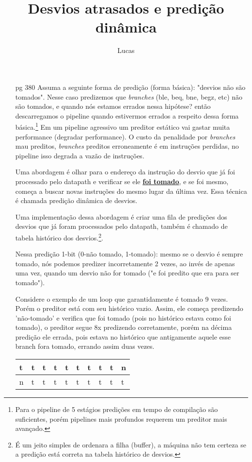 \documentclass{article}
\author{Lucas}
\title{Desvios atrasados e predição dinâmica}
\begin{document}
\maketitle

\begin{enumerate}
\item[pg 380] Assuma a seguinte forma de predição (forma básica): "desvios não
são tomados". Nesse caso predizemos que \textit{branches} (ble, beq, bne, begz,
etc) não são tomados, e quando nós estamos errados nessa hipótese? então
descarregamos o pipeline quando estivermos errados a respeito dessa forma
básica.\footnote{Para o pipeline de 5 estágios predições em tempo de compilação
são suficientes, porém pipelines mais profundos requerem um preditor mais
avançado.} Em um pipeline agressivo um preditor estático vai gastar muita
performance (degradar performance). O custo da penalidade por \textit{branches}
mau preditos, \textit{branches} preditos erroneamente é em instruções perdidas,
no pipeline isso degrada a vazão de instruções.

Uma abordagem é olhar para o endereço da instrução do desvio que já  foi 
processado pelo datapath e verificar se ele \textbf{\underline{foi tomado}}, e 
se foi mesmo, começa a buscar novas instruções do mesmo lugar da última vez. 
Essa técnica é chamada predição dinâmica de desvios.

Uma implementação dessa abordagem é criar uma fila de predições dos desvios que 
já foram processados pelo datapath, também é chamado de tabela histórico dos 
desvios.\footnote{É um jeito simples de ordenara a filha (buffer), a máquina 
não tem certeza se a predição está correta na tabela histórico de desvios.}.

Nessa predição 1-bit (0-não tomado, 1-tomado): mesmo se o desvio é sempre 
tomado, nós podemos predizer incorretamente 2 vezes, ao invés de apenas uma 
vez, quando um desvio não for tomado ("e foi predito que era para ser tomado").

Considere o exemplo de um loop que garantidamente é tomado 9 vezes. Porém o
preditor está com seu histórico vazio. Assim, ele começa predizendo 'não-tomado'
e verifica que foi tomado (pois no histórico estava como foi tomado), o preditor
segue 8x predizendo corretamente, porém na décima predição ele errada, pois
estava no histórico que antigamente aquele esse branch fora tomado, errando
assim duas vezes.

\begin{tabular}{|l|l|l|l|l|l|l|l|l|l|}
\hline t & t & t & t & t & t & t & t & t & n \\
\hline n & t & t & t & t & t & t & t & t & t \\
\hline
\end{tabular}


\end{enumerate}
\end{document}
